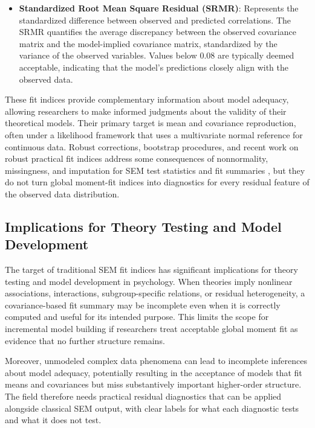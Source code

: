 \documentclass[floatsintext,a4paper]{apa7} %
\begin{document}
\begin{itemize}
		\item \textbf{Standardized Root Mean Square Residual (SRMR)}: Represents the standardized difference between observed and predicted correlations. The SRMR quantifies the average discrepancy between the observed covariance matrix and the model-implied covariance matrix, standardized by the variance of the observed variables. Values below 0.08 are typically deemed acceptable, indicating that the model's predictions closely align with the observed data.
	\end{itemize}
	
	These fit indices provide complementary information about model adequacy, allowing researchers to make informed judgments about the validity of their theoretical models. Their primary target is mean and covariance reproduction, often under a likelihood framework that uses a multivariate normal reference for continuous data. Robust corrections, bootstrap procedures, and recent work on robust practical fit indices address some consequences of nonnormality, missingness, and imputation for SEM test statistics and fit summaries \citep{satorra1994corrections,bollen1992bootstrapping,jia2026obtaining}, but they do not turn global moment-fit indices into diagnostics for every residual feature of the observed data distribution.
	
	\subsection{Implications for Theory Testing and Model Development}
	
	The target of traditional SEM fit indices has significant implications for theory testing and model development in psychology. When theories imply nonlinear associations, interactions, subgroup-specific relations, or residual heterogeneity, a covariance-based fit summary may be incomplete even when it is correctly computed and useful for its intended purpose. This limits the scope for incremental model building if researchers treat acceptable global moment fit as evidence that no further structure remains.
	
	Moreover, unmodeled complex data phenomena can lead to incomplete inferences about model adequacy, potentially resulting in the acceptance of models that fit means and covariances but miss substantively important higher-order structure. The field therefore needs practical residual diagnostics that can be applied alongside classical SEM output, with clear labels for what each diagnostic tests and what it does not test.
	
\end{document}
